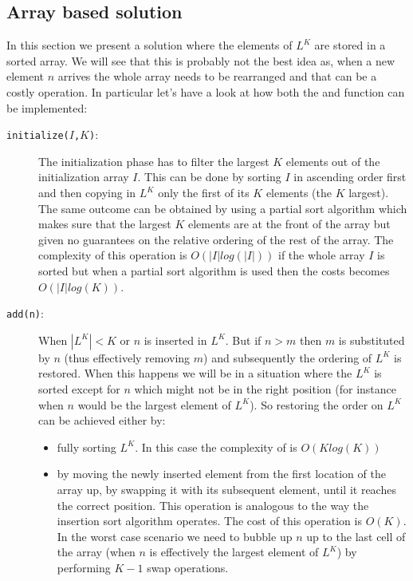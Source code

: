 \subsection{Array based solution}
\label{kth_largest_in_stream:sec:bruteforce}
In this section we present a solution where the elements of $L^K$ are stored in a sorted array. We
will see that this is probably not the best idea as, when a new element $n$ arrives the whole array
needs to be rearranged and that can be a costly operation. In particular let's have a look at how
both the  and  function can be implemented:
\begin{description}
	\item[\texttt{initialize($I$,$K$)}:] The initialization phase has to filter the largest $K$
	elements out of the initialization array $I$. This can be done by sorting $I$ in ascending order
	first  and then copying in $L^K$ only the first of its $K$ elements (the $K$ largest). The same outcome
	can be obtained by using a partial sort algorithm which makes sure that the largest $K$
	elements are at the front of the array but given no guarantees on the relative ordering of the
	rest of the array. The complexity of this operation is $O(|I| log(|I|))$ if the whole array $I$
	is sorted but when a partial sort algorithm is used then the costs becomes $O(|I| log(K))$.
	\item [\texttt{add(n)}:] When $|L^K|<K$ or  $n$ is inserted in $L^K$. But if $n>m$ then $m$ is
	 substituted by $n$ (thus effectively removing $m$) and subsequently the ordering of $L^K$ is
	 restored. When this happens we will be in a situation where the $L^K$ is sorted except for $n$
	 which might not be in the right position (for instance when $n$ would be the largest element of
	 $L^K$). So restoring the order on $L^K$ can be achieved either by:
	 \begin{itemize}
		 \item fully sorting $L^K$. In this case the complexity of  is $O(K log(K))$
		 \item by moving the newly inserted element from the first location of the array up, by
		 swapping it with its subsequent element, until it reaches the correct position. This
		 operation is analogous to the way the insertion sort algorithm operates. The cost of this
		 operation is $O(K)$. In the worst case scenario we need to bubble up $n$ up to the last cell of the
		 array (when $n$ is effectively the largest element of $L^K$) by performing $K-1$ swap
		 operations.
	 \end{itemize}
\end{description}

